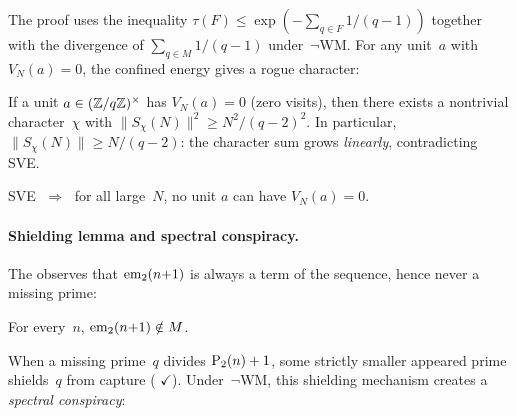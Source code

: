 \noindent
The proof uses the inequality
$\tau(F) \leq \exp(-\sum_{q \in F} 1/(q{-}1))$
together with the divergence of $\sum_{q \in M} 1/(q{-}1)$ under~$\neg$WM\@.
For any unit~$a$ with $V_N(a) = 0$, the confined energy gives a rogue
character:

\begin{theorem}
\label{thm:rogue-character}
If a unit $a \in (\mathbb{Z}/q\mathbb{Z})^\times$ has $V_N(a) = 0$ (zero visits), then
there exists a nontrivial character~$\chi$ with
$\lVert S_\chi(N) \rVert^2 \geq N^2 / (q{-}2)^2$.
In particular, $\lVert S_\chi(N) \rVert \geq N/(q{-}2)$: the
character sum grows \emph{linearly}, contradicting SVE\@.
\end{theorem}

\begin{theorem}
\label{thm:sve-contradicts-avoidance}
SVE $\;\Longrightarrow\;$ for all large~$N$, no unit $a$ can have
$V_N(a) = 0$.
\end{theorem}

\paragraph{Shielding lemma and spectral conspiracy.}
The  observes that $\mathrm{em}_{2}(n{+}1)$ is always
a term of the sequence, hence never a missing prime:

\begin{theorem}
\label{thm:shielding}
For every~$n$, $\mathrm{em}_{2}(n{+}1) \notin M$.
\end{theorem}

\noindent
When a missing prime~$q$ divides $\mathrm{P}_{2}(n)+1$, some strictly smaller
appeared prime shields~$q$ from capture
(
{\color{leanink}$\checkmark$}).
Under~$\neg$WM, this shielding mechanism creates a \emph{spectral conspiracy}:

